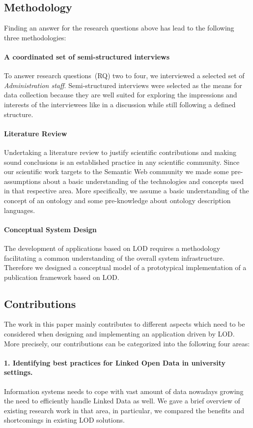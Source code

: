 \documentclass{article}
\begin{document}
\subsection{Methodology}
Finding an answer for the research questions above has lead to the following three methodologies:
\paragraph{A coordinated set of semi-structured interviews}
To answer research questions~(RQ) two to four, we interviewed a selected set of \textit{Administration staff}. Semi-structured interviews were selected as the means for data collection because they are well suited for exploring the impressions and interests of the interviewees like in a discussion while still following a defined structure. 
\paragraph{Literature Review}
Undertaking a literature review to justify scientific contributions and making sound conclusions is an established practice in any scientific community. Since our scientific work targets to the Semantic Web community we made some pre-assumptions about a basic understanding of the technologies and concepts used in that respective area. More specifically, we assume a basic understanding of the concept of an ontology and some pre-knowledge about ontology description languages. 
\paragraph{Conceptual System Design}
The development of applications based on LOD requires a methodology facilitating a common understanding of the overall system infrastructure. Therefore we designed a conceptual model of a prototypical implementation of a publication framework based on LOD. 

\subsection{Contributions}
The work in this paper mainly contributes to different aspects which need to be considered when designing and implementing an application driven by LOD.
More precisely, our contributions can be categorized into the following four areas:
\paragraph{1. Identifying best practices for Linked Open Data in university settings.}
Information systems needs to cope with vast amount of data nowadays growing the need to efficiently handle Linked Data as well. We gave a brief overview of existing research work in that area, in particular, we compared the benefits and shortcomings in existing LOD solutions. 
\end{document}
